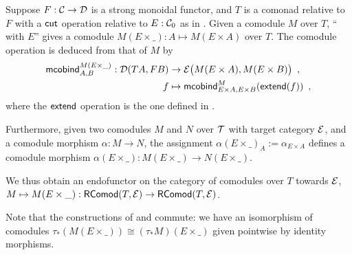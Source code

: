 \documentclass[envcountsame]{llncs}
\begin{document}
\begin{definition}%
\label{def:product_in_context}
 Suppose $F:{\mathcal{C}}\to\mathcal{D}$ is a strong monoidal functor, and $T$ is a comonad relative to $F$ with a $\mathsf{cut}$ operation 
 relative to $E:{\mathcal{C}}_0$ as in .
 Given a comodule $M$ over $T$,   \enquote{ with $E$}
 gives a comodule $M(E\times\_) : A \mapsto M(E\times A) $ over $T$.
 The comodule operation is deduced from that of $M$ by 
 \begin{align*} \mathsf{mcobind}^{M(E\times\_)}_{A,B} : \mathcal{D}(TA,FB)&\to \mathcal{E}\bigl(M(E\times A), M(E\times B)\bigr) \enspace ,\\ 
                                                      f &\mapsto \mathsf{mcobind}^M_{E\times A,E\times B}(\mathsf{extend}(f)) \enspace ,
  \end{align*}                                        
where the $\mathsf{extend}$ operation is the one defined in .
 
 Furthermore, given two comodules $M$ and $N$ over $\mathcal{T}$ with target category $\mathcal{E}$, and a comodule morphism $\alpha : M \to N$,  
 the assignment $ \alpha(E \times \_)_A := \alpha_{E\times A}$ defines a comodule morphism 
  $\alpha(E\times \_) : M(E\times \_) \to N(E\times \_) $.

\begin{Long}
  \noindent
  We thus obtain an endofunctor on the category of comodules over $T$ towards $\mathcal{E}$,
   $ M \mapsto  M (E\times \_) : \mathsf{RComod}(T,\mathcal{E}) \to \mathsf{RComod}(T,\mathcal{E})$.
\end{Long}
\end{definition}



\begin{remark}\label{rem:prod_pullback_commute}
 Note that the constructions of  and  commute:
 we have an isomorphism of comodules 
  $\tau_*(M(E\times \_)) \cong (\tau_*M)(E \times \_)$
 given pointwise by identity morphisms.
\end{remark}
\end{document}

